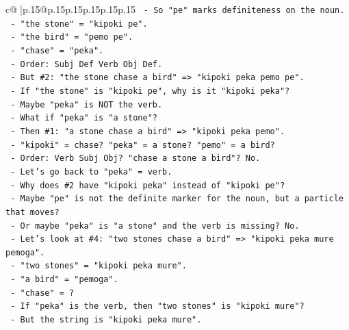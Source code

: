 \documentclass{article}
\begin{document}
{\begin{supertabular}{c@{$\;$}|p{.15\linewidth}@{}p{.15\linewidth}p{.15\linewidth}p{.15\linewidth}p{.15\linewidth}p{.15\linewidth}}
{{{\texttt{                    {-} So "pe" marks definiteness on the noun.} \\
\texttt{                    {-} "the stone" = "kipoki pe".} \\
\texttt{                    {-} "the bird" = "pemo pe".} \\
\texttt{                    {-} "chase" = "peka".} \\
\texttt{                    {-} Order: Subj Def Verb Obj Def.} \\
\texttt{                    {-} But \#2: "the stone chase a bird" => "kipoki peka pemo pe".} \\
\texttt{                      {-} If "the stone" is "kipoki pe", why is it "kipoki peka"?} \\
\texttt{                      {-} Maybe "peka" is NOT the verb.} \\
\texttt{                      {-} What if "peka" is "a stone"?} \\
\texttt{                      {-} Then \#1: "a stone chase a bird" => "kipoki peka pemo".} \\
\texttt{                        {-} "kipoki" = chase? "peka" = a stone? "pemo" = a bird?} \\
\texttt{                        {-} Order: Verb Subj Obj? "chase a stone a bird"? No.} \\
\texttt{                      {-} Let's go back to "peka" = verb.} \\
\texttt{                      {-} Why does \#2 have "kipoki peka" instead of "kipoki pe"?} \\
\texttt{                      {-} Maybe "pe" is not the definite marker for the noun, but a particle that moves?} \\
\texttt{                      {-} Or maybe "peka" is "a stone" and the verb is missing? No.} \\
\texttt{                      {-} Let's look at \#4: "two stones chase a bird" => "kipoki peka mure pemoga".} \\
\texttt{                        {-} "two stones" = "kipoki peka mure".} \\
\texttt{                        {-} "a bird" = "pemoga".} \\
\texttt{                        {-} "chase" = ?} \\
\texttt{                        {-} If "peka" is the verb, then "two stones" is "kipoki mure"?} \\
\texttt{                        {-} But the string is "kipoki peka mure".} \\
}}}
\end{supertabular}}
\end{document}
